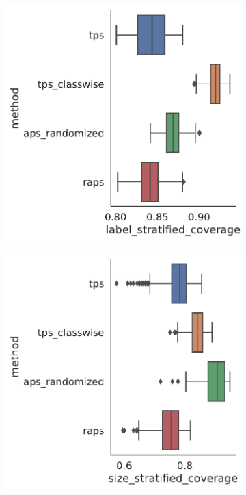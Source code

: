 \begin{figure}
    \begin{subfigure}{0.48\linewidth}
    \includegraphics[width=\linewidth,alt={Box plots for method comparison on Cora dataset label stratified coverage.}]{graphConformal/figures/split/cora_label_stratified_coverage}
    \end{subfigure}
    \begin{subfigure}{0.48\linewidth}
        \includegraphics[width=\linewidth,alt={Box plots for method comparison on Cora dataset size stratified coverage.}]{graphConformal/figures/split/cora_size_stratified_coverage} 

\end{subfigure}
\end{figure}
